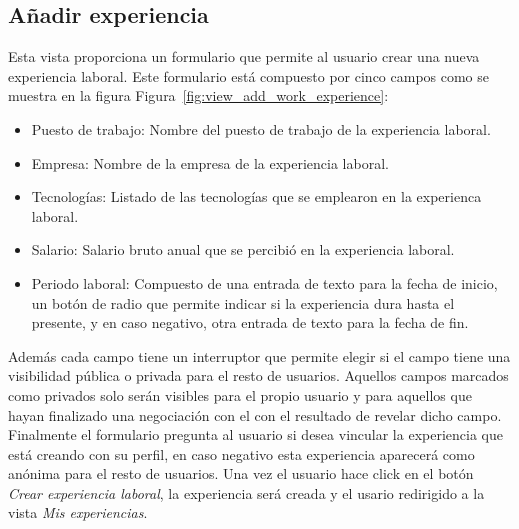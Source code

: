 \documentclass[a4paper, 12pt]{book}
\begin{document}
    \subsection{Añadir experiencia}
    \label{subsec:view_add_work_experience}
    Esta vista proporciona un formulario que permite al usuario crear una nueva experiencia laboral.
    Este formulario está compuesto por cinco campos como se muestra en la figura Figura~\ref{fig:view_add_work_experience}:
    \begin{itemize}
        \item Puesto de trabajo: Nombre del puesto de trabajo de la experiencia laboral.
        \item Empresa: Nombre de la empresa de la experiencia laboral.
        \item Tecnologías: Listado de las tecnologías que se emplearon en la experienca laboral.
        \item Salario: Salario bruto anual que se percibió en la experiencia laboral.
        \item Periodo laboral: Compuesto de una entrada de texto para la fecha de inicio, un botón de radio que permite indicar si la experiencia dura hasta el presente, y en caso negativo, otra entrada de texto para la fecha de fin.
    \end{itemize}
    Además cada campo tiene un interruptor que permite elegir si el campo tiene una visibilidad pública o privada para el resto de usuarios. Aquellos campos marcados como privados solo serán visibles para el propio usuario y para aquellos que hayan finalizado una negociación con el con el resultado de revelar dicho campo.
    Finalmente el formulario pregunta al usuario si desea vincular la experiencia que está creando con su perfil, en caso negativo esta experiencia aparecerá como anónima para el resto de usuarios.
    Una vez el usuario hace click en el botón \emph{Crear experiencia laboral}, la experiencia será creada y el usario redirigido a la vista \emph{Mis experiencias}.
\end{document}
